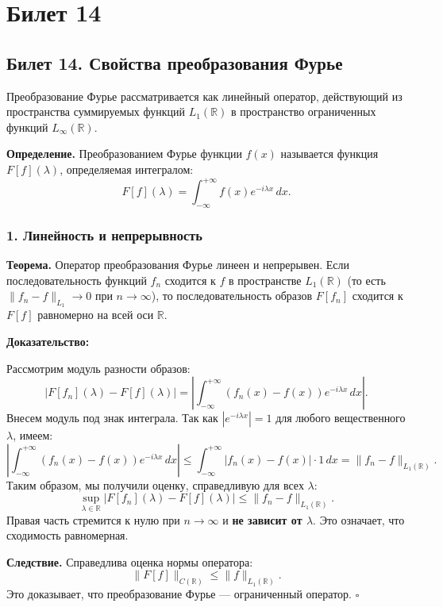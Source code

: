 \documentclass[12pt,a4paper,openany]{book}
\begin{document}
\chapter{Билет 14}
\section*{Билет 14. Свойства преобразования Фурье}

Преобразование Фурье рассматривается как линейный оператор, действующий из пространства суммируемых функций $L_1(\mathbb{R})$ в пространство ограниченных функций $L_\infty(\mathbb{R})$.

\textbf{Определение.} Преобразованием Фурье функции $f(x)$ называется функция $F[f](\lambda)$, определяемая интегралом:
\[
F[f](\lambda) = \int_{-\infty}^{+\infty} f(x) e^{-i\lambda x} \, dx.
\]

\hrulefill

\subsection{1. Линейность и непрерывность}

\textbf{Теорема.} Оператор преобразования Фурье линеен и непрерывен. Если последовательность функций $f_n$ сходится к $f$ в пространстве $L_1(\mathbb{R})$ (то есть $\|f_n - f\|_{L_1} \to 0$ при $n \to \infty$), то последовательность образов $F[f_n]$ сходится к $F[f]$ равномерно на всей оси $\mathbb{R}$.

\textbf{Доказательство:}

Рассмотрим модуль разности образов:
\[
\left| F[f_n](\lambda) - F[f](\lambda) \right| = \left| \int_{-\infty}^{+\infty} (f_n(x) - f(x)) e^{-i\lambda x} \, dx \right|.
\]
Внесем модуль под знак интеграла. Так как $|e^{-i\lambda x}| = 1$ для любого вещественного $\lambda$, имеем:
\[
\left| \int_{-\infty}^{+\infty} (f_n(x) - f(x)) e^{-i\lambda x} \, dx \right| \le \int_{-\infty}^{+\infty} |f_n(x) - f(x)| \cdot 1 \, dx = \| f_n - f \|_{L_1(\mathbb{R})}.
\]
Таким образом, мы получили оценку, справедливую для всех $\lambda$:
\[
\sup_{\lambda \in \mathbb{R}} \left| F[f_n](\lambda) - F[f](\lambda) \right| \le \| f_n - f \|_{L_1(\mathbb{R})}.
\]
Правая часть стремится к нулю при $n \to \infty$ и \textbf{не зависит от $\lambda$}. Это означает, что сходимость равномерная.

\textbf{Следствие.} Справедлива оценка нормы оператора:
\[
\| F[f] \|_{C(\mathbb{R})} \le \| f \|_{L_1(\mathbb{R})}.
\]
Это доказывает, что преобразование Фурье — ограниченный оператор. \hfill $\square$
\end{document}
